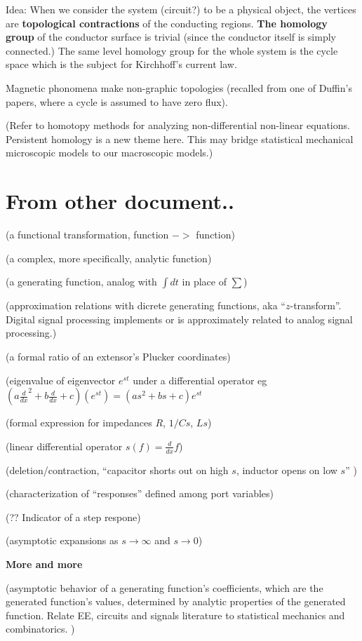 \documentclass{article}
\begin{document}
Idea: When we consider the system (circuit?) to be a physical object, the 
vertices are \textbf{topological contractions} of the conducting regions.
\textbf{The homology group} of the conductor surface is trivial (since the
conductor itself is simply connected.)   The same level homology group for 
the whole system is the cycle space which is the subject for Kirchhoff's 
current law.

Magnetic phonomena make non-graphic topologies (recalled from one of 
Duffin's papers, where a cycle is assumed to have zero flux).

(Refer to homotopy methods for analyzing non-differential non-linear 
equations.  Persistent homology is a new theme here.  This may bridge
statistical mechanical microscopic models to our macroscopic models.)

\section{From other document..}


(a functional transformation, function $->$ function)

(a complex, more specifically, analytic function)

(a generating function, analog with $\int dt$ in place of $\sum$)

(approximation relations with dicrete generating functions, 
aka ``$z$-transform''. Digital signal processing implements or
is approximately related to analog signal processing.)

(a formal ratio of an extensor's Plucker coordinates)

(eigenvalue of eigenvector $e^{s t}$ under a differential operator eg 
$(a\frac{d}{dx}^2 + b\frac{d}{dx} + c)(e^{st}) = (as^2 +bs + c)e^{st}$

(formal expression for impedances $R$, $1/Cs$, $Ls$)

(linear differential operator $s(f) = \frac{d}{dx}f$)

(deletion/contraction, 
``capacitor shorts out on high $s$, inductor opens on low $s$'' 
\cite{intuitAna})

(characterization of ``responses'' defined among port variables)

(?? Indicator of a step respone)

(asymptotic expansions as $s\rightarrow\infty$
and $s\rightarrow 0$)

\noindent\textbf{More and more}

(asymptotic behavior of a generating function's coefficients, which are
the generated function's values, determined by analytic properties of the
generated function.  Relate EE, circuits and signals literature to 
statistical mechanics and combinatorics.  
\cite{statMechForGraphers,multivarHalfPlane,AnalyticCombinatoricsBook})
\end{document}
